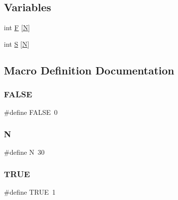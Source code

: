 \subsection*{Variables}
\begin{DoxyCompactItemize}
\item 
int \mbox{\hyperlink{fibonacci_8_c_ab78443a75edcfbbaa1be74fc5d94ec1d}{F}} \mbox{[}\mbox{\hyperlink{_a_p_p_s_2_t_d_o_2packing_8_c_a0240ac851181b84ac374872dc5434ee4}{N}}\mbox{]}
\item 
int \mbox{\hyperlink{fibonacci_8_c_aa07280b20c7249c2d094cb7d90a2afde}{S}} \mbox{[}\mbox{\hyperlink{_a_p_p_s_2_t_d_o_2packing_8_c_a0240ac851181b84ac374872dc5434ee4}{N}}\mbox{]}
\end{DoxyCompactItemize}


\subsection{Macro Definition Documentation}
\mbox{\label{fibonacci_8_c_aa93f0eb578d23995850d61f7d61c55c1}} 
\subsubsection{\texorpdfstring{F\+A\+L\+SE}{FALSE}}
{\footnotesize\ttfamily \#define F\+A\+L\+SE~0}

\mbox{\label{fibonacci_8_c_a0240ac851181b84ac374872dc5434ee4}} 
\subsubsection{\texorpdfstring{N}{N}}
{\footnotesize\ttfamily \#define N~30}

\mbox{\label{fibonacci_8_c_aa8cecfc5c5c054d2875c03e77b7be15d}} 
\subsubsection{\texorpdfstring{T\+R\+UE}{TRUE}}
{\footnotesize\ttfamily \#define T\+R\+UE~1}



